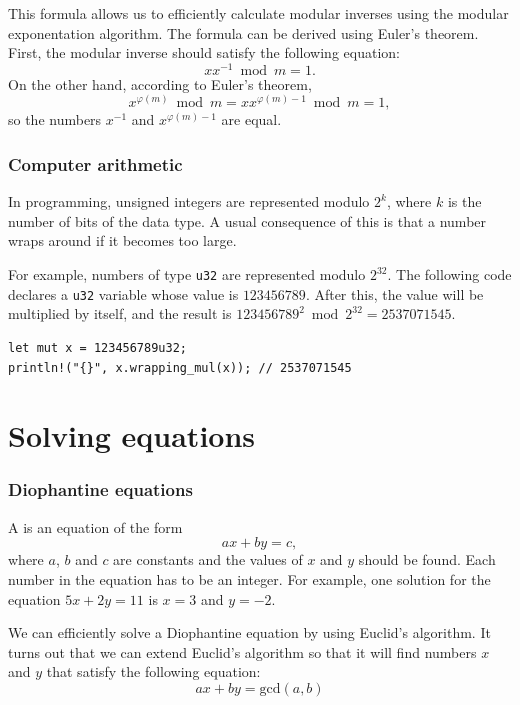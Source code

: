 This formula allows us to efficiently calculate
modular inverses using the modular exponentation algorithm.
The formula can be derived using Euler's theorem.
First, the modular inverse should satisfy the following equation:
\[
x x^{-1} \bmod m = 1.
\]
On the other hand, according to Euler's theorem,
\[
x^{\varphi(m)} \bmod m =  xx^{\varphi(m)-1} \bmod m = 1,
\]
so the numbers $x^{-1}$ and $x^{\varphi(m)-1}$ are equal.

\subsubsection{Computer arithmetic}

In programming, unsigned integers are represented modulo $2^k$,
where $k$ is the number of bits of the data type.
A usual consequence of this is that a number wraps around
if it becomes too large.

For example, numbers of type \texttt{u32}
are represented modulo $2^{32}$.
The following code declares a \texttt{u32}
variable whose value is $123456789$.
After this, the value will be multiplied by itself,
and the result is
$123456789^2 \bmod 2^{32} = 2537071545$.

\begin{lstlisting}
let mut x = 123456789u32;
println!("{}", x.wrapping_mul(x)); // 2537071545
\end{lstlisting}

\section{Solving equations}

\subsubsection*{Diophantine equations}


A 
is an equation of the form
\[ ax + by = c, \]
where $a$, $b$ and $c$ are constants
and the values of $x$ and $y$ should be found.
Each number in the equation has to be an integer.
For example, one solution for the equation
$5x+2y=11$ is $x=3$ and $y=-2$.


We can efficiently solve a Diophantine equation
by using Euclid's algorithm.
It turns out that we can extend Euclid's algorithm
so that it will find numbers $x$ and $y$
that satisfy the following equation:
\[
ax + by = \textrm{gcd}(a,b)
\]

